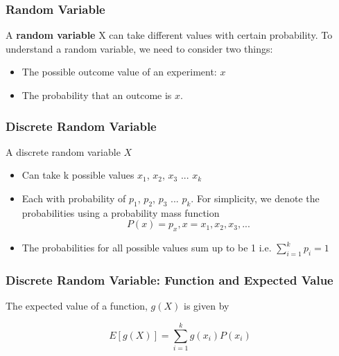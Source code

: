 \documentclass[notheorems, aspectratio=54]{beamer}
\begin{document}
\begin{frame}
\frametitle{Random Variable}

A \textbf{random variable} X can take different values with certain probability. To understand a random variable, we need to consider two things: 
\begin{itemize}
\item The possible outcome value of an experiment: $x$ 
\item The probability that an outcome is $x$.

\end{itemize}

\end{frame}


\begin{frame}
\frametitle{Discrete Random Variable}

A discrete random variable $X$
\begin{itemize}
\item Can take k possible values $x_{1}$, $x_{2}$, $x_{3}$ ... $x_{k}$
\item Each with probability of $p_{1}$, $p_{2}$, $p_{3}$ ... $p_{k}$. For simplicity, we denote the probabilities using a probability mass function $$P(x)=p_{x}, x=x_1, x_2, x_3, ...$$
\item The probabilities for all possible values sum up to be 1 i.e. $\sum_{i=1}^{k}p_{i}=1$
\end{itemize}

\end{frame}

\begin{frame}
\frametitle{Discrete Random Variable: Function and Expected Value }
The expected value of a function, $g(X)$ is given by 

$$E[g(X)]=\sum_{i=1}^kg(x_i)P(x_i)$$

\end{frame}
\end{document}
